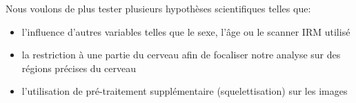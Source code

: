 Nous voulons de plus tester plusieurs hypothèses scientifiques telles que:
\begin{itemize}
	\item l'influence d'autres variables telles que le sexe, l'âge ou le scanner IRM utilisé
	\item la restriction à une partie du cerveau afin de focaliser notre analyse sur des régions précises du cerveau
	\item l'utilisation de pré-traitement supplémentaire (squelettisation) sur les images
\end{itemize}

% 
